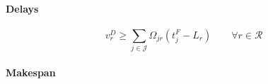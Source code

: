 
    





\paragraph{Delays}

\begin{equation}
v^{D}_r \ge
\sum_{j \in \mathcal{J}} \Omega_{jr}(t^{F}_j - L_r)
\qquad \forall r \in \mathcal{R}
\end{equation}


\paragraph{Makespan}

